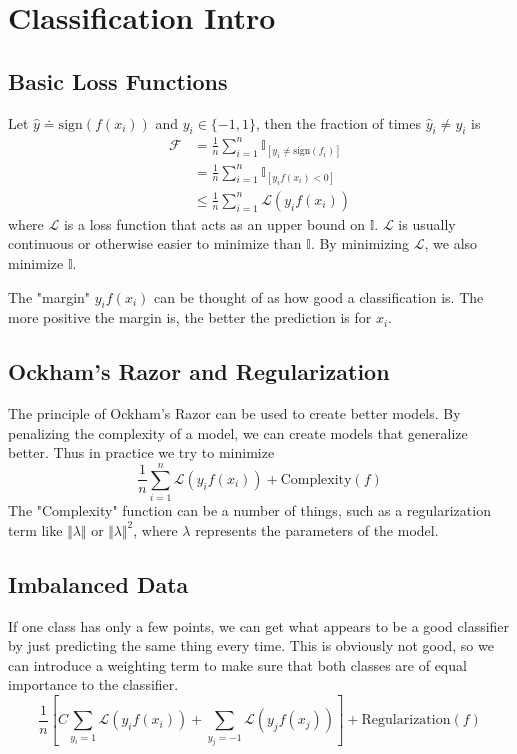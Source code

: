 \documentclass{article}
\begin{document}
\section{Classification Intro}
\subsection{Basic Loss Functions}
Let $\hat{y} \doteq \text{sign}(f(x_i))$ and $y_i \in \{-1,1\}$, then the fraction of times $\hat{y}_i \neq y_i$ is
\begin{align*}
	\mathcal{F} &= \frac{1}{n} \sum_{i=1}^n \mathbb{I}_{[y_i \neq \text{sign}(f_i)]} \\
		    &= \frac{1}{n} \sum_{i=1}^n \mathbb{I}_{[y_i f(x_i) < 0]} \\
		    &\leq \frac{1}{n} \sum_{i=1}^n \mathcal{L}(y_i f(x_i))
\end{align*}
where $\mathcal{L}$ is a loss function that acts as an upper bound on $\mathbb{I}$. $\mathcal{L}$ is usually continuous or otherwise easier to minimize than $\mathbb{I}$. By minimizing $\mathcal{L}$, we also minimize $\mathbb{I}$.

The "margin" $y_i f(x_i)$ can be thought of as how good a classification is. The more positive the margin is, the better the prediction is for $x_i$.

\subsection{Ockham's Razor and Regularization}
The principle of Ockham's Razor can be used to create better models. By penalizing the complexity of a model, we can create models that generalize better. Thus in practice we try to minimize
\[
	\frac{1}{n} \sum_{i=1}^n \mathcal{L}(y_i f(x_i)) + \text{Complexity}(f)
\] 
The "Complexity" function can be a number of things, such as a regularization term like $\Vert{\lambda}\Vert$ or  $\Vert{\lambda}\Vert^2$, where $\lambda$ represents the parameters of the model.

\subsection{Imbalanced Data}
If one class has only a few points, we can get what appears to be a good classifier by just predicting the same thing every time. This is obviously not good, so we can introduce a weighting term to make sure that both classes are of equal importance to the classifier.
\[
	\frac{1}{n} \left[ C \sum_{y_i = 1} \mathcal{L}(y_i f(x_i)) + \sum_{y_j = -1} \mathcal{L}(y_j f(x_j)) \right] + \text{Regularization}(f)
\] 
\end{document}
